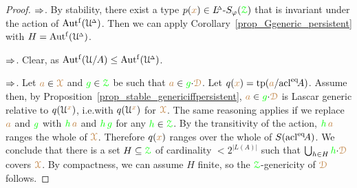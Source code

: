 \begin{proof} 
  $\IMP$.
  By stability, there exist a type $p({\mr x})\in\LDelta\mbox{-}S_\phi(\grZ)$ that is invariant under the action of $\Autf(\UDelta)$.
  Then we can apply Corollary~\ref{prop_Ggeneric_persistent} with $H=\Autf(\UDelta)$.

  $\IMP$. Clear, as $\Autf(\U/A)\le\Autf(\UDelta)$.

  $\IMP$.
  Let ${\mr a}\in\mrX$ and ${\gr g}\in\grZ$ be such that ${\mr a}\in{\gr g}{\cdot}\mrD$.
  Let $q({\mr x})=\tp({\mr a}/\acl^\eq\!A)$.
  Assume  then, by Proposition~\ref{prop_stable_genericiffpersistent}, ${\mr a}\in{\gr g}{\cdot}\mrD$ is Lascar generic relative to $q(\U^{\mr x})$, i.e.\@ with $q(\U^{\mr x})$ for $\mrX$.
  The same reasoning applies if we replace ${\mr a}$ and ${\gr g}$ with  ${\gr h}\,{\mr a}$ and ${\gr h}\,{\gr g}$ for any ${\gr h}\in\grZ$.
  By the transitivity of the action, ${\gr h}\,{\mr a}$ ranges the whole of $\mrX$.
  Therefore $q({\mr x})$ ranges over the whole of $S(\acl^\eq\!A)$.
  We conclude that there is a set $H\subseteq\grZ$ of cardinality $<2^{|L(A)|}$ such that $\bigcup_{h\in H}{\gr h}{\cdot}\mrD$ covers $\mrX$.
  By compactness, we can assume $H$ finite, so the $\grZ$-genericity of $\mrD$ follows.
\end{proof}

